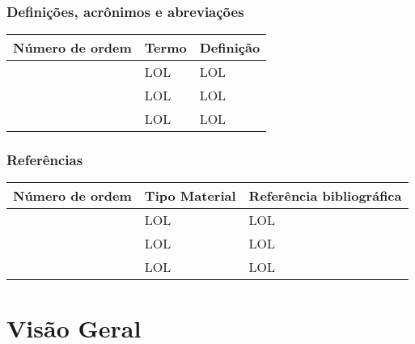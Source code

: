 \documentclass[12pt,a4paper]{article}
\begin{document}
        	
        	\subsubsection{Definições, acrônimos e abreviações}
        	        	\begin{table}[h]
        		        	\noindent\begin{tabular}{|p{}|p{}|p{}|}
        		        		\hline
        		        		\setcounter{Number}{0}
        		        		\textbf{Número de ordem} & \textbf{Termo} & \textbf{Definição} \\
        		        		\hline
        		        		\Item & LOL & LOL \\
        		        		\hline
        		        		\Item & LOL & LOL \\
        		        		\hline
        		        		\Item & LOL & LOL \\
        		        		\hline
        		        	\end{tabular}
        	        	\end{table}
        	        	
        	\subsubsection{Referências}
        	        	\begin{table}[!h]
        		        	\noindent\begin{tabular}{|p{}|p{}|p{}|}
        		        		\hline
        		        		\setcounter{Number}{0}
        		        		\textbf{Número de ordem} & \textbf{Tipo Material} & \textbf{Referência bibliográfica} \\
        		        		\hline
        		        		\Item & LOL & LOL \\
        		        		\hline
        		        		\Item & LOL & LOL \\
        		        		\hline
        		        		\Item & LOL & LOL \\
        		        		\hline
        		        	\end{tabular}
        	        	\end{table}	
        \newpage	
        \section{Visão Geral}
        
        \newpage	
\end{document}

